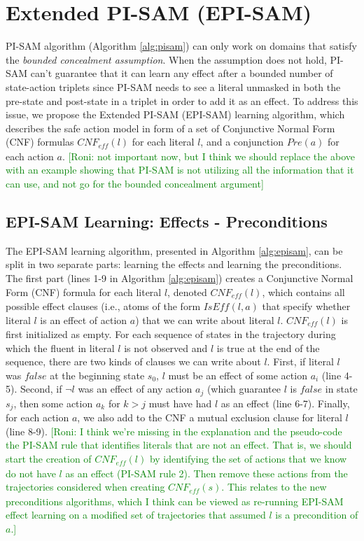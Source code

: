\documentclass[letterpaper]{article} %
\newcommand{\eff}{\textit{eff}}
\newcommand{\false}{\textit{false}}
\newcommand{\iseff}{\textit{IsEff}}
\newcommand{\roni}[1]{{\textcolor{green}{[Roni: #1]}}}
\begin{document}
\section{Extended PI-SAM (EPI-SAM)}

PI-SAM algorithm (Algorithm \ref{alg:pisam}) can only work on domains that satisfy the \textit{bounded concealment assumption}. When the assumption does not hold, PI-SAM can't guarantee that it can learn any effect after a bounded number of state-action triplets since PI-SAM needs to see a literal unmasked in both the pre-state and post-state in a triplet in order to add it as an effect. To address this issue, we propose the Extended PI-SAM (EPI-SAM) learning algorithm, which describes the safe action model in form of a set of Conjunctive Normal Form (CNF) formulas $CNF_\eff(l)$ for each literal $l$, 
and a conjunction $Pre(a)$ for each action $a$. 
\roni{not important now, but I think we should replace the above with an example showing that PI-SAM is not utilizing all the information that it can use, and not go for the bounded concealment argument}

\subsection{EPI-SAM Learning: Effects - Preconditions}
The EPI-SAM learning algorithm, presented in Algorithm \ref{alg:episam}, can be split in two separate parts: learning the effects and learning the preconditions. 
The first part (lines 1-9 in Algorithm \ref{alg:episam}) creates a Conjunctive Normal Form (CNF) formula for each literal $l$, denoted $CNF_{\eff}(l)$, which contains all possible effect clauses (i.e., atoms of the form $\iseff(l,a) $ that specify whether literal $l$ is an effect of action $a$) that we can write about literal $l$. 
$CNF_{\eff}(l)$ is first initialized as empty. For each sequence of states in the trajectory during which the fluent in literal $l$ is not observed and $l$ is true at the end of the sequence, there are two kinds of clauses we can write about $l$. First, if literal $l$ was $false$ at the beginning state $s_0$, $l$ must be an effect of some action $a_i$ (line 4-5). Second, if $\neg l$ was an effect of any action $a_j$ (which guarantee $l$ is $\false$ in state $s_j$, then some action $a_k$ for $k > j$ must have had $l$ as an effect (line 6-7). Finally, for each action $a$, we also add to the CNF a mutual exclusion clause for literal $l$ (line 8-9).   
\roni{I think we're missing in the explanation and the pseudo-code the PI-SAM rule that identifies literals that are not an effect. 
That is, we should start the creation of $CNF_\eff(l)$ by identifying the set of actions that we know do not have $l$ as an effect (PI-SAM rule 2). 
Then remove these actions from the trajectories considered when creating $CNF_\eff(s)$. This relates to the new preconditions algorithms, which I think can be viewed as re-running EPI-SAM effect learning on a modified set of trajectories that assumed $l$ is a precondition of $a$.}
\end{document}
